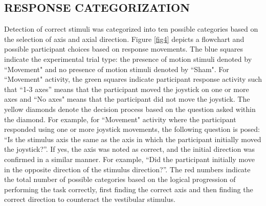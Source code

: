 \documentclass{ieeeaccess}
\begin{document}
\subsection{RESPONSE CATEGORIZATION}
Detection of correct stimuli was categorized into ten possible categories based on the selection of axis and axial direction. Figure \ref{fig4} depicts a flowchart and possible participant choices based on response movements. The blue squares indicate the experimental trial type: the presence of motion stimuli denoted by ``Movement" and no presence of motion stimuli denoted by “Sham". For “Movement" activity, the green squares indicate participant response activity such that “1-3 axes” means that the participant moved the joystick on one or more axes and “No axes" means that the participant did not move the joystick. The yellow diamonds denote the decision process based on the question asked within the diamond. For example, for “Movement" activity where the participant responded using one or more joystick movements, the following question is posed: “Is the stimulus axis the same as the axis in which the participant initially moved the joystick?”. If yes, the axis was noted as correct, and the initial direction was confirmed in a similar manner. For example, “Did the participant initially move in the opposite direction of the stimulus direction?”. The red numbers indicate the total number of possible categories based on the logical progression of performing the task correctly, first finding the correct axis and then finding the correct direction to counteract the vestibular stimulus.
\end{document}
